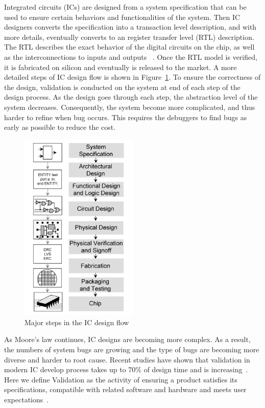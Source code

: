 \documentclass[12pt,frontmatter,copyright,thesis]{usfmanus}
\begin{document}
Integrated circuits (ICs) are designed from
a system specification that can be used to ensure
certain behaviors and functionalities of the system. 
Then IC designers converts the specification
into a transaction level description, and with more
details, eventually converts to an register transfer level (RTL) description. 
The RTL describes the exact behavior of the digital circuits on the chip, 
as well as the interconnections to inputs and outputs ~\cite{white2004process}.
Once the RTL model is verified, it is fabricated on silicon and eventually
is released to the market.
A more detailed
steps of IC design flow
is
shown in Figure~\ref{ICdesign}. 
To ensure
the correctness of the design, 
validation is conducted on the system at end of each step of the design process.
As the design goes through each step, the abstraction level
of the system decreases. Consequently,
the system become more complicated, and thus
harder to refine when bug occurs. This requires
the debuggers to find bugs as early as
possible to reduce the cost.


\begin{figure}[h]
\centering
\includegraphics[width=0.5\textwidth]{integrated_circuit_design.png}
\caption{Major steps in the IC design flow~\cite{white2004process}}
\label{ICdesign}
\end{figure}

As Moore's law continues, IC designs are becoming more complex.
As a result, the numbers of system bugs are 
growing and the type of bugs are becoming more diverse
and harder to root cause.
Recent studies have shown that validation in modern IC
develop process takes up to 70$\%$
of design time and is increasing~\cite{foster2013design}.
Here we define Validation as the activity of ensuring a product satisfies its specifications, 
compatible with related software and hardware and meets user expectations~\cite{validationWall}.
\end{document}
